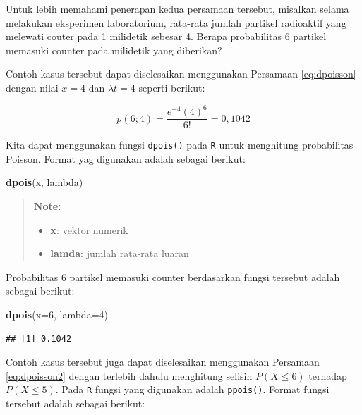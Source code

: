 \documentclass[]{book}
\newenvironment{Shaded}{\begin{snugshade}}{\end{snugshade}}
\newcommand{\KeywordTok}[1]{\textcolor[rgb]{0.13,0.29,0.53}{\textbf{#1}}}
\newcommand{\DataTypeTok}[1]{\textcolor[rgb]{0.13,0.29,0.53}{#1}}
\newcommand{\DecValTok}[1]{\textcolor[rgb]{0.00,0.00,0.81}{#1}}
\newcommand{\NormalTok}[1]{#1}
\providecommand{\tightlist}{%
  \setlength{\itemsep}{0pt}\setlength{\parskip}{0pt}}
\begin{document}
Untuk lebih memahami penerapan kedua persamaan tersebut, misalkan selama
melakukan eksperimen laboratorium, rata-rata jumlah partikel radioaktif
yang melewati couter pada 1 milidetik sebesar 4. Berapa probabilitas 6
partikel memasuki counter pada milidetik yang diberikan?

Contoh kasus tersebut dapat diselesaikan menggunakan Persamaan
\eqref{eq:dpoisson} dengan nilai \(x=4\) dan \(\lambda t=4\) seperti
berikut:

\[
p\left(6;4\right)=\frac{e^{-4}\left(4\right)^6}{6!}=0,1042
\]

Kita dapat menggunakan fungsi \texttt{dpois()} pada \texttt{R} untuk
menghitung probabilitas Poisson. Format yag digunakan adalah sebagai
berikut:

\begin{Shaded}
\begin{Highlighting}[]
\KeywordTok{dpois}\NormalTok{(x, lambda)}
\end{Highlighting}
\end{Shaded}

\begin{quote}
\textbf{Note: }

\begin{itemize}
\tightlist
\item
  \textbf{x}: vektor numerik
\item
  \textbf{lamda}: jumlah rata-rata luaran
\end{itemize}
\end{quote}

Probabilitas 6 partikel memasuki counter berdasarkan fungsi tersebut
adalah sebagai berikut:

\begin{Shaded}
\begin{Highlighting}[]
\KeywordTok{dpois}\NormalTok{(}\DataTypeTok{x=}\DecValTok{6}\NormalTok{, }\DataTypeTok{lambda=}\DecValTok{4}\NormalTok{)}
\end{Highlighting}
\end{Shaded}

\begin{verbatim}
## [1] 0.1042
\end{verbatim}

Contoh kasus tersebut juga dapat diselesaikan menggunakan Persamaan
\eqref{eq:dpoisson2} dengan terlebih dahulu menghitung selisih
\(P(X\le6)\) terhadap \(P(X\le5)\). Pada \texttt{R} fungsi yang
digunakan adalah \texttt{ppois()}. Format fungsi tersebut adalah sebagai
berikut:
\end{document}
